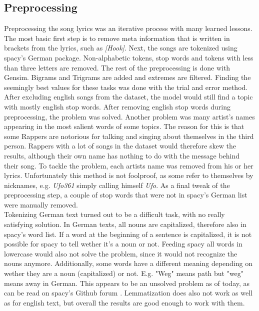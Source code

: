 \documentclass[conference]{IEEEtran}
\begin{document}
\subsection{Preprocessing} \label{preprocessing}
Preprocessing the song lyrics was an iterative process with many learned lessons. The most basic first step is to remove meta information that is written in brackets from the lyrics, such as \textit{[Hook]}. Next, the songs are tokenized using spacy's German package. Non-alphabetic tokens, stop words and tokens with less than three letters are removed. The rest of the preprocessing is done with Gensim. Bigrams and Trigrams are added and extremes are filtered. Finding the seemingly best values for these tasks was done with the trial and error method.\\
After excluding english songs from the dataset, the model would still find a topic with mostly english stop words. After removing english stop words during preprocessing, the problem was solved. Another problem was many artist's names appearing in the most salient words of some topics. The reason for this is that some Rappers are notorious for talking and singing about themselves in the third person. Rappers with a lot of songs in the dataset would therefore skew the results, although their own name has nothing to do with the message behind their song. To tackle the problem, each artists name was removed from his or her lyrics. Unfortunately this method is not foolproof, as some refer to themselves by nicknames, e.g. \textit{Ufo361} simply calling himself \textit{Ufo}. As a final tweak of the preprocessing step, a couple of stop words that were not in spacy's German list were manually removed.\\
Tokenizing German text turned out to be a difficult task, with no really satisfying solution. In German texts, all nouns are capitalized, therefore also in spacy's word list. If a word at the beginning of a sentence is capitalized, it is not possible for spacy to tell wether it's a noun or not. Feeding spacy all words in lowercase would also not solve the problem, since it would not recognize the nouns anymore. Additionally, some words have a different meaning depending on wether they are a noun (capitalized) or not. E.g. "Weg" means path but "weg" means away in German. This appears to be an unsolved problem as of today, as can be read on spacy's Github forum \cite{spacy_issues}. Lemmatization does also not work as well as for english text, but overall the results are good enough to work with them.
\end{document}
